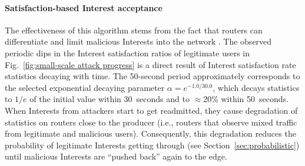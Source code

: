 \documentclass[10pt,conference]{IEEEtran}
\begin{document}
{%

\paragraph{\textbf{Satisfaction-based Interest acceptance}}

The effectiveness of this algorithm stems from the fact that routers can differentiate and limit malicious Interests into the network%
. The observed periodic dips in the Interest satisfaction ratios of legitimate users in Fig.~\ref{fig:small-scale attack progress} is a direct result of Interest satisfaction rate statistics decaying with time. The 50-second period approximately corresponds to the selected exponential decaying parameter $\alpha=e^{−1.0/30.0}$, which decays statistics to $1/e$ of the initial value within 30~seconds and to $\approx$20\% within 50~seconds.
When Interests from attackers start to get readmitted, they cause degradation of statistics on routers close to the producer (i.e., routers that observe mixed traffic from legitimate and malicious users). Consequently, this degradation reduces the probability of legitimate Interests getting through (see Section~\ref{sec:probabilistic}) until malicious Interests are ``pushed back'' again to the edge.


}
\end{document}
